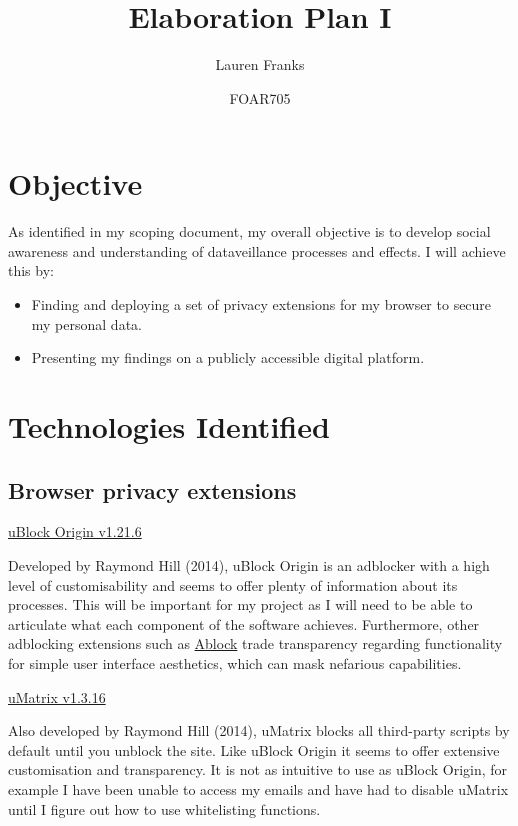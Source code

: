 \documentclass{article}
\title{Elaboration Plan I}
\author{Lauren Franks}
\date{FOAR705}
\begin{document}
\maketitle

\section{Objective}

As identified in my scoping document, my overall objective is to develop social awareness and understanding of dataveillance processes and effects. I will achieve this by:
\begin{itemize}
\item Finding and deploying a set of privacy extensions for my browser to secure my personal data.
\item Presenting my findings on a publicly accessible digital platform.
\end{itemize}

\section{Technologies Identified}
\subsection{Browser privacy extensions}

 
\href{https://github.com/gorhill/uBlock}{uBlock Origin v1.21.6}

Developed by Raymond Hill (2014), uBlock Origin is an adblocker with a high level of customisability and seems to offer plenty of information about its processes. This will be important for my project as I will need to be able to articulate what each component of the software achieves. Furthermore, other adblocking extensions such as \href{https://getadblock.com/}{Ablock} trade transparency regarding functionality for simple user interface aesthetics, which can mask nefarious capabilities.\newline


\noindent\href{https://github.com/gorhill/uMatrix}{uMatrix v1.3.16}

Also developed by Raymond Hill (2014), uMatrix blocks all third-party scripts by default until you unblock the site. Like uBlock Origin it seems to offer extensive customisation and transparency. It is not as intuitive to use as uBlock Origin, for example I have been unable to access my emails and have had to disable uMatrix until I figure out how to use whitelisting functions.\newline
\end{document}
